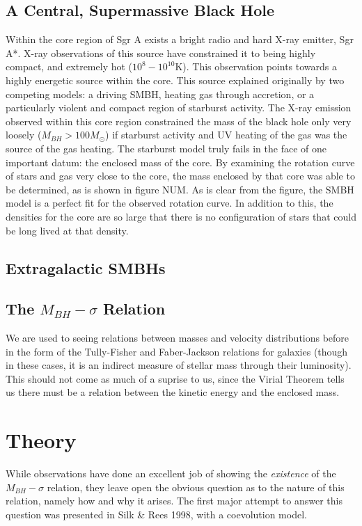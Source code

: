 \documentclass[12pt]{article}
\begin{document}
\subsection{A Central, Supermassive Black Hole}
Within the core region of Sgr A exists a bright radio and hard X-ray emitter, 
Sgr A*.  X-ray observations of this source have constrained it to being highly
compact, and extremely hot ($10^8-10^{10}$K).  This observation points towards
a highly energetic source within the core.  This source explained originally by
two competing models: a driving SMBH, heating gas through accretion, or a 
particularly violent and compact region of starburst activity.  The X-ray 
emission observed within this core region constrained the mass of the black hole
only very loosely ($M_{BH} > 100 M_\odot$) if starburst activity and UV heating
of the gas was the source of the gas heating.  The starburst model truly fails
in the face of one important datum:  the enclosed mass of the core.  By 
examining the rotation curve of stars and gas very close to the core, the 
mass enclosed by that core was able to be determined, as is shown in figure NUM.
As is clear from the figure, the SMBH model is a perfect fit for the observed 
rotation curve.  In addition to this, the densities for the core are so large
that there is no configuration of stars that could be long lived at that 
density.

\subsection{Extragalactic SMBHs}
\subsection{The $M_{BH}-\sigma$ Relation}
We are used to seeing relations between masses and velocity distributions before
in the form of the Tully-Fisher and Faber-Jackson relations for galaxies (though
in these cases, it is an indirect measure of stellar mass through their 
luminosity).  This should not come as much of a suprise to us, since the 
Virial Theorem tells us there must be a relation between the kinetic energy and
the enclosed mass.
\section{Theory}
While observations have done an excellent job of showing the \textit{existence}
of the $M_{BH}-\sigma$ relation, they leave open the obvious question as to the
nature of this relation, namely how and why it arises.  The first major attempt
to answer this question was presented in Silk \& Rees 1998, with a coevolution 
model.
\end{document}
